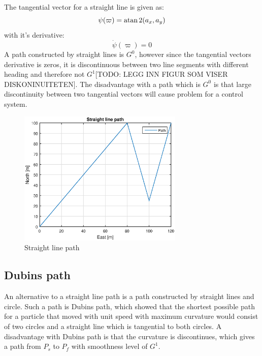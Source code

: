 The tangential vector for a straight line is given as:
\begin{equation}
\psi(\varpi) = \operatorname{atan}2(a_x,a_y)
\end{equation}
with it's derivative:
\begin{equation}
\dot{\psi}(\varpi) = 0
\end{equation}
A path constructed by straight lines is $G^0$, however since the tangential vectors derivative is zeros, it is discontinuous between two line segments with different heading and therefore not $G^1$[TODO: LEGG INN FIGUR SOM VISER DISKONINUITETEN]. The disadvantage with a path which is $G^0$ is that large discontinuity between two tangential vectors will cause problem for a control system. 
\begin{figure}[H]
\includegraphics[width=0.7\textwidth]{figs/TheoryPlot/StraightLine.eps}
\caption{Straight line path}
\end{figure}
\subsection{Dubins path}\label{S:DubinsPath}
An alternative to a straight line path is a path constructed by straight lines and circle. Such a path is Dubins path\citep{dubins1957curves}, which showed that the shortest possible path for a particle that moved with unit speed with maximum curvature would consist of two circles and a straight line which is tangential to both circles. A disadvantage with Dubins path is that the curvature is discontinues, which gives a path from $P_s$ to $P_f$ with smoothness level of $G^1$.

